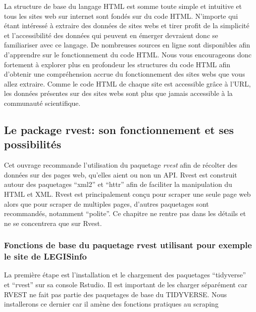 \documentclass[
  letterpaper,
  DIV=11,
  numbers=noendperiod]{scrreprt}
\begin{document}
La structure de base du langage HTML est somme toute simple et intuitive
et tous les sites web sur internet sont fondés sur du code HTML.
N'importe qui étant intéressé à extraire des données de sites webs et
tirer profit de la simplicité et l'accessibilité des données qui peuvent
en émerger devraient donc se familiariser avec ce langage. De nombreuses
sources en ligne sont disponibles afin d'apprendre sur le fonctionnement
du code HTML. Nous vous encourageons donc fortement à explorer plus en
profondeur les structures du code HTML afin d'obtenir une compréhension
accrue du fonctionnement des sites webs que vous allez extraire. Comme
le code HTML de chaque site est accessible grâce à l'URL, les données
présentes sur des sites webs sont plus que jamais accessible à la
communauté scientifique.

\hypertarget{le-package-rvest-son-fonctionnement-et-ses-possibilituxe9s}{%
\subsection{\texorpdfstring{\textbf{Le package rvest: son fonctionnement
et ses
possibilités}}{Le package rvest: son fonctionnement et ses possibilités}}\label{le-package-rvest-son-fonctionnement-et-ses-possibilituxe9s}}

Cet ouvrage recommande l'utilisation du paquetage \emph{rvest} afin de
récolter des données sur des pages web, qu'elles aient ou non un API.
Rvest est construit autour des paquetages ``xml2'' et ``httr'' afin de
faciliter la manipulation du HTML et XML. Rvest est principalement conçu
pour scraper une seule page web alors que pour scraper de multiples
pages, d'autres paquetages sont recommandés, notamment ``polite''. Ce
chapitre ne rentre pas dans les détails et ne se concentrera que sur
Rvest.

\hypertarget{fonctions-de-base-du-paquetage-rvest-utilisant-pour-exemple-le-site-de-legisinfo}{%
\subsubsection{\texorpdfstring{\textbf{Fonctions de base du paquetage
rvest utilisant pour exemple le site de
LEGISinfo}}{Fonctions de base du paquetage rvest utilisant pour exemple le site de LEGISinfo}}\label{fonctions-de-base-du-paquetage-rvest-utilisant-pour-exemple-le-site-de-legisinfo}}

La première étape est l'installation et le chargement des paquetages
``tidyverse'' et ``rvest'' sur sa console Rstudio. Il est important de
les charger séparément car RVEST ne fait pas partie des paquetages de
base du TIDYVERSE. Nous installerons ce dernier car il amène des
fonctions pratiques au scraping
\end{document}
